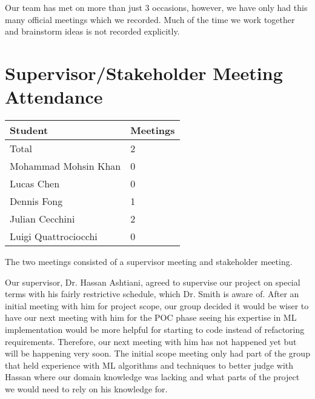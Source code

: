 \documentclass{article}
\begin{document}
Our team has met on more than just 3 occasions, however, we have only
had this many official meetings which we recorded. Much of the time
we work together and brainstorm ideas is not recorded explicitly.

\section{Supervisor/Stakeholder Meeting Attendance}


\begin{table}[H]
\centering
\begin{tabular}{ll}
\toprule
\textbf{Student} & \textbf{Meetings}\\
\midrule
Total & 2\\
Mohammad Mohsin Khan & 0\\
Lucas Chen & 0\\
Dennis Fong & 1\\
Julian Cecchini & 2\\
Luigi Quattrociocchi & 0\\
\bottomrule
\end{tabular}
\end{table}


The two meetings consisted of a supervisor meeting and stakeholder meeting. 

Our supervisor, Dr. Hassan Ashtiani, agreed to supervise our project on special 
terms with his fairly restrictive schedule, which Dr. Smith is aware of. After 
an initial meeting with him for project scope, our group decided it would be wiser 
to have our next meeting with him for the POC phase seeing his expertise in ML 
implementation would be more helpful for starting to code instead of refactoring 
requirements. Therefore, our next meeting with him has not happened yet but will 
be happening very soon. The initial scope meeting only had part of the group that
held experience with ML algorithms and techniques to better judge with Hassan where 
our domain knowledge was lacking and what parts of the project we would need to rely 
on his knowledge for.
\end{document}
